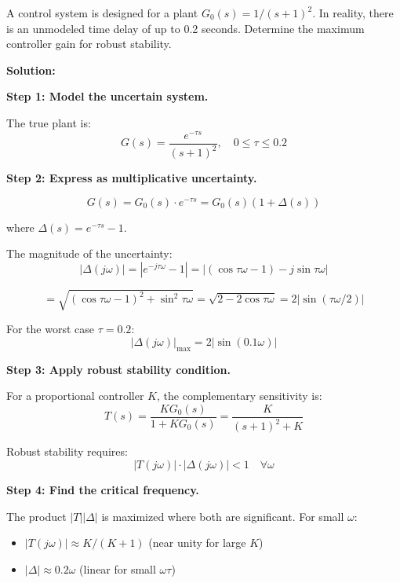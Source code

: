 \begin{example}
\label{ex:time_delay_robustness}
A control system is designed for a plant $G_0(s) = 1/(s+1)^2$. In reality, there is an unmodeled time delay of up to 0.2 seconds. Determine the maximum controller gain for robust stability.

\textbf{Solution:}

\textbf{Step 1: Model the uncertain system.}

The true plant is:
\begin{equation}
G(s) = \frac{e^{-\tau s}}{(s+1)^2}, \quad 0 \leq \tau \leq 0.2
\end{equation}

\textbf{Step 2: Express as multiplicative uncertainty.}

\begin{equation}
G(s) = G_0(s) \cdot e^{-\tau s} = G_0(s)(1 + \Delta(s))
\end{equation}

where $\Delta(s) = e^{-\tau s} - 1$.

The magnitude of the uncertainty:
\begin{equation}
|\Delta(j\omega)| = |e^{-j\tau\omega} - 1| = |(\cos\tau\omega - 1) - j\sin\tau\omega|
\end{equation}

\begin{equation}
= \sqrt{(\cos\tau\omega - 1)^2 + \sin^2\tau\omega} = \sqrt{2 - 2\cos\tau\omega} = 2|\sin(\tau\omega/2)|
\end{equation}

For the worst case $\tau = 0.2$:
\begin{equation}
|\Delta(j\omega)|_{\max} = 2|\sin(0.1\omega)|
\end{equation}

\textbf{Step 3: Apply robust stability condition.}

For a proportional controller $K$, the complementary sensitivity is:
\begin{equation}
T(s) = \frac{KG_0(s)}{1 + KG_0(s)} = \frac{K}{(s+1)^2 + K}
\end{equation}

Robust stability requires:
\begin{equation}
|T(j\omega)| \cdot |\Delta(j\omega)| < 1 \quad \forall \omega
\end{equation}

\textbf{Step 4: Find the critical frequency.}

The product $|T||\Delta|$ is maximized where both are significant. For small $\omega$:
\begin{itemize}
    \item $|T(j\omega)| \approx K/(K+1)$ (near unity for large $K$)
    \item $|\Delta| \approx 0.2\omega$ (linear for small $\omega\tau$)
\end{itemize}


\end{example}
